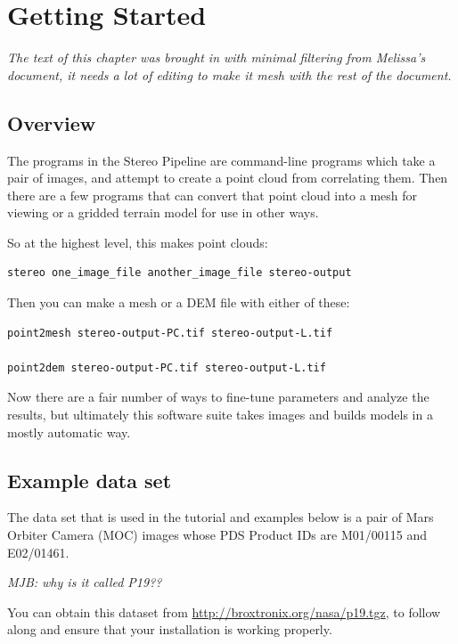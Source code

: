\chapter{Getting Started}

\emph{The text of this chapter was brought in with minimal filtering from Melissa's document, it needs a lot of editing to make it mesh with the rest of the document.}

\section{Overview}

The programs in the Stereo Pipeline are command-line programs which
take a pair of images, and attempt to create a point cloud from
correlating them.  Then there are a few programs that can convert
that point cloud into a mesh for viewing or a gridded terrain model
for use in other ways.

So at the highest level, this makes point clouds:

\begin{verbatim}
stereo one_image_file another_image_file stereo-output
\end{verbatim}

Then you can make a mesh or a DEM file with either of these:

\begin{verbatim}
point2mesh stereo-output-PC.tif stereo-output-L.tif

point2dem stereo-output-PC.tif stereo-output-L.tif
\end{verbatim}

Now there are a fair number of ways to fine-tune parameters and
analyze the results, but ultimately this software suite takes images
and builds models in a mostly automatic way.

\section{Example data set}

The data set that is used in the tutorial and examples below is a
pair of Mars Orbiter Camera (MOC)
\citep{1992JGR....97.7699M,2001JGR...10623429M} images whose PDS
Product IDs are M01/00115 and E02/01461.

\emph{MJB: why is it called P19??}

You can obtain this dataset from \url{http://broxtronix.org/nasa/p19.tgz},
to follow along and ensure that your installation is working properly.


